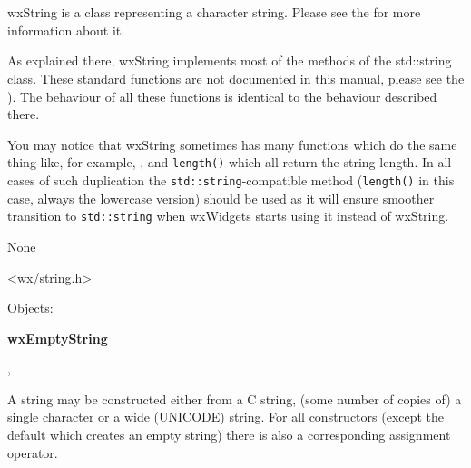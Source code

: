 \section{}\label{wxstring}

wxString is a class representing a character string. Please see the 
 for more information about it.

As explained there, wxString implements most of the methods of the std::string
class.
These standard functions are not documented in this manual, please see the
).
The behaviour of all these functions is identical to the behaviour described
there.

You may notice that wxString sometimes has many functions which do the same
thing like, for example, , 
 and {\tt length()} which all return the string
length. In all cases of such duplication the {\tt std::string}-compatible
method ({\tt length()} in this case, always the lowercase version) should be
used as it will ensure smoother transition to {\tt std::string} when wxWidgets
starts using it instead of wxString.


None


<wx/string.h>




Objects:

{\bf wxEmptyString}


, 



\label{constructorsinwxstring}

A string may be constructed either from a C string, (some number of copies of)
a single character or a wide (UNICODE) string. For all constructors (except the
default which creates an empty string) there is also a corresponding assignment
operator.

\\
\\


